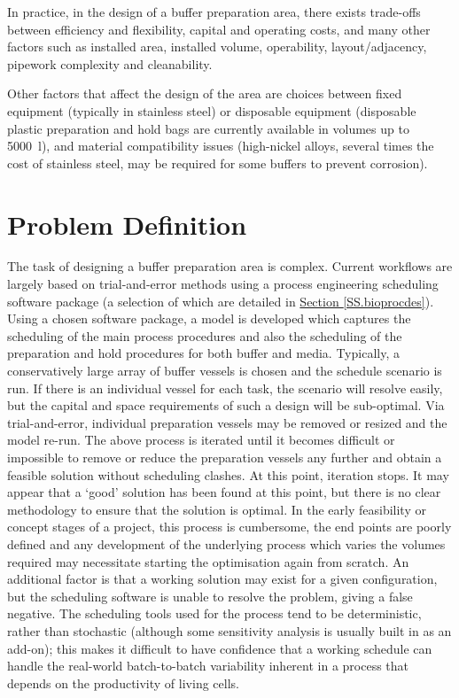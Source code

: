 In practice, in the design of a buffer preparation area, there exists
trade-offs between efficiency and flexibility, capital and operating costs,
and many other factors such as installed area, installed volume, operability,
layout/adjacency, pipework complexity and cleanability.

Other factors that affect the design of the area are choices between fixed
equipment (typically in stainless steel) or disposable equipment (disposable
plastic preparation and hold bags are currently available in volumes up to
\SI{5000}{\litre}), and material compatibility issues (high-nickel alloys,
several times the cost of stainless steel, may be required for some buffers to
prevent corrosion).

\section{Problem Definition}\label{SS.probdef}
The task of designing a buffer preparation area is complex.
Current workflows are largely based on trial-and-error methods using a process
engineering scheduling software package (a selection of which are detailed in
\hyperref[SS.bioprocdes]{Section \ref*{SS.bioprocdes}}).
Using a chosen software package, a model is developed which captures the
scheduling of the main process procedures and also the scheduling of the
preparation and hold procedures for both buffer and media.
Typically, a conservatively large array of buffer vessels is chosen and the
schedule scenario is run.
If there is an individual vessel for each task, the scenario will resolve
easily, but the capital and space requirements of such a design will be
sub-optimal.
Via trial-and-error, individual preparation vessels may be removed or resized
and the model re-run.
The above process is iterated until it becomes difficult or impossible to
remove or reduce the preparation vessels any further and obtain a feasible
solution without scheduling clashes.
At this point, iteration stops.
It may appear that a `good' solution has been found at this point, but there
is no clear methodology to ensure that the solution is optimal.
In the early feasibility or concept stages of a project, this process is
cumbersome, the end points are poorly defined and any development of the
underlying process which varies the volumes required may necessitate starting
the optimisation again from scratch.
An additional factor is that a working solution may exist for a given
configuration, but the scheduling software is unable to resolve the problem,
giving a false negative. 
The scheduling tools used for the process tend to be deterministic, rather than
stochastic (although some sensitivity analysis is usually built in as an 
add-on); this makes it difficult to have confidence that a working schedule can
handle the real-world batch-to-batch variability inherent in a process that
depends on the productivity of living cells.

